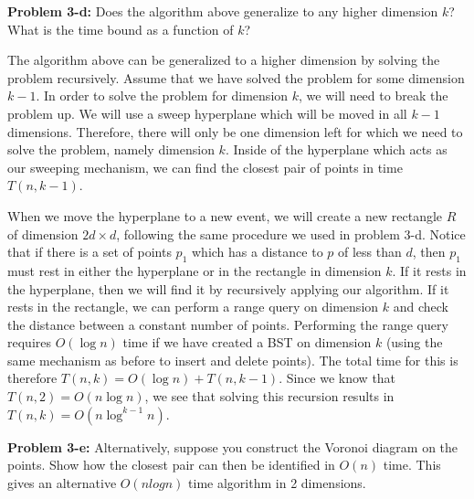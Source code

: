 \documentclass[psamsfonts]{amsart}
\newenvironment{sol}{\vspace{0.25cm}{\large \bfseries Solution:}}{\qedsymbol}
\newenvironment{prob}[1]{\begin{framed}{\large \bfseries Problem #1:}}{\end{framed}}
\begin{document}
\begin{prob}{3-d}
Does the algorithm above generalize to any higher dimension $k$? What is the time bound as a function of $k$?
\end{prob}
\begin{sol}
The algorithm above can be generalized to a higher dimension by solving the problem recursively. Assume that we have solved the problem for some dimension $k-1$. In order to solve the problem for dimension $k$, we will need to break the problem up. We will use a sweep hyperplane which will be moved in all $k-1$ dimensions. Therefore, there will only be one dimension left for which we need to solve the problem, namely dimension $k$. Inside of the hyperplane which acts as our sweeping mechanism, we can find the closest pair of points in time $T(n, k-1)$. 

When we move the hyperplane to a new event, we will create a new rectangle $R$ of dimension $2d \times d$, following the same procedure we used in problem 3-d. Notice that if there is a set of points $p_1$ which has a distance to $p$ of less than $d$, then $p_1$ must rest in either the hyperplane or in the rectangle in dimension $k$. If it rests in the hyperplane, then we will find it by recursively applying our algorithm. If it rests in the rectangle, we can perform a range query on dimension $k$ and check the distance between a constant number of points. Performing the range query requires $O(\log n)$ time if we have created a BST on dimension $k$ (using the same mechanism as before to insert and delete points). The total time for this is therefore $T(n, k) = O(\log n) + T(n, k-1)$. Since we know that $T(n, 2) = O(n \log n)$, we see that solving this recursion results in $T(n, k) = O(n \log^{k-1} n)$.  
\end{sol}

\begin{prob}{3-e}
Alternatively, suppose you construct the Voronoi diagram on the points. Show how the closest pair can then be identified in $O(n)$ time. This gives an alternative $O(n log n)$ time algorithm in 2 dimensions.
\end{prob}
\begin{sol}

\end{sol}
\end{document}
